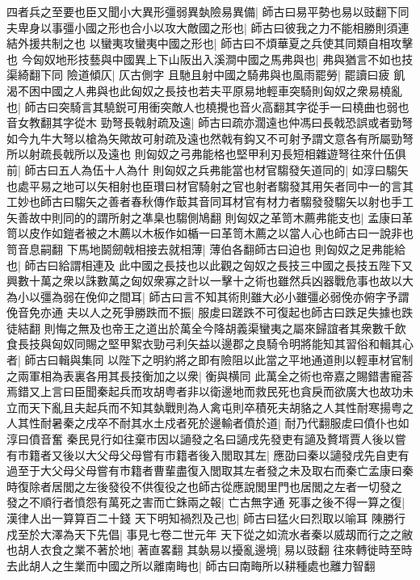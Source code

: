 四者兵之至要也臣又聞小大異形彊弱異埶險易異備|{
	師古曰易平勢也易以豉翻下同}
夫卑身以事彊小國之形也合小以攻大敵國之形也|{
	師古曰彼我之力不能相勝則須連結外援共制之也}
以蠻夷攻蠻夷中國之形也|{
	師古曰不煩華夏之兵使其同類自相攻擊也}
今匈奴地形技藝與中國異上下山阪出入溪澗中國之馬弗與也|{
	弗與猶言不如也技渠綺翻下同}
險道傾仄|{
	仄古側字}
且馳且射中國之騎弗與也風雨罷勞|{
	罷讀曰疲}
飢渴不困中國之人弗與也此匈奴之長技也若夫平原易地輕車突騎則匈奴之衆易橈亂也|{
	師古曰突騎言其驍鋭可用衝突敵人也橈攪也音火高翻其字從手一曰橈曲也弱也音女教翻其字從木}
勁弩長戟射疏及遠|{
	師古曰疏亦濶遠也仲馮曰長戟恐誤或者勁弩如今九牛大弩以槍為矢歟故可射疏及遠也然戟有鈎又不可射予謂文意各有所屬勁弩所以射疏長戟所以及遠也}
則匈奴之弓弗能格也堅甲利刃長短相雜遊弩往來什伍俱前|{
	師古曰五人為伍十人為什}
則匈奴之兵弗能當也材官騶發矢道同的|{
	如淳曰騶矢也處平易之地可以矢相射也臣瓚曰材官騎射之官也射者騶發其用矢者同中一的言其工妙也師古曰騶矢之善者春秋傳作菆其音同耳材官有材力者騶發發騶矢以射也手工矢善故中則同的的謂所射之凖臬也騶側鳩翻}
則匈奴之革笥木薦弗能支也|{
	孟康曰革笥以皮作如鎧者被之木薦以木板作如楯一曰革笥木薦之以當人心也師古曰一說非也笥音息嗣翻}
下馬地鬬劒戟相接去就相薄|{
	薄伯各翻師古曰迫也}
則匈奴之足弗能給也|{
	師古曰給謂相連及}
此中國之長技也以此觀之匈奴之長技三中國之長技五陛下又興數十萬之衆以誅數萬之匈奴衆寡之計以一擊十之術也雖然兵凶器戰危事也故以大為小以彊為弱在俛仰之間耳|{
	師古曰言不知其術則雖大必小雖彊必弱俛亦俯字予謂俛音免亦通}
夫以人之死爭勝跌而不振|{
	服䖍曰蹉跌不可復起也師古曰跌足失據也跌徒結翻}
則悔之無及也帝王之道出於萬全今降胡義渠蠻夷之屬來歸誼者其衆數千飲食長技與匈奴同賜之堅甲絮衣勁弓利矢益以邊郡之良騎令明將能知其習俗和輯其心者|{
	師古曰輯與集同}
以陛下之明約將之即有險阻以此當之平地通道則以輕車材官制之兩軍相為表裏各用其長技衡加之以衆|{
	衡與横同}
此萬全之術也帝嘉之賜錯書寵荅焉錯又上言曰臣聞秦起兵而攻胡粤者非以衛邊地而救民死也貪戾而欲廣大也故功未立而天下亂且夫起兵而不知其埶戰則為人禽屯則卒積死夫胡貉之人其性耐寒揚粤之人其性耐暑秦之戌卒不耐其水土戍者死於邊輸者僨於道|{
	耐乃代翻服䖍曰僨仆也如淳曰僨音奮}
秦民見行如往棄市因以讁發之名曰讁戌先發吏有讁及贅壻賈人後以嘗有市籍者又後以大父母父母嘗有市籍者後入閭取其左|{
	應劭曰秦以讁發戌先自吏有過至于大父母父母嘗有市籍者曹輩盡復入閭取其左者發之未及取右而秦亡孟康曰秦時復除者居閭之左後發役不供復役之也師古從應說閭里門也居閭之左者一切發之}
發之不順行者憤怨有萬死之害而亡銖兩之報|{
	亡古無字通}
死事之後不得一算之復|{
	漢律人出一算算百二十錢}
天下明知禍烈及己也|{
	師古曰猛火曰烈取以喻耳}
陳勝行戍至於大澤為天下先倡|{
	事見七卷二世元年}
天下從之如流水者秦以威刼而行之之敝也胡人衣食之業不著於地|{
	著直畧翻}
其埶易以擾亂邊境|{
	易以豉翻}
往來轉徙時至時去此胡人之生業而中國之所以離南畮也|{
	師古曰南畮所以耕種處也離力智翻}
